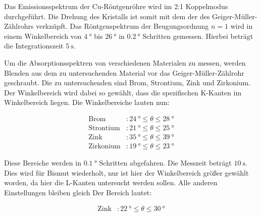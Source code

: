 Das Emissionsspektrum der Cu-Röntgenröhre wird im 2:1 Koppelmodus durchgeführt.
Die Drehung des Kristalls ist somit mit dem der des Geiger-Müller-Zählrohrs verknüpft.
Das Röntgenspektrum der Beugungsordnung $n=1$ wird in einem Winkelbereich von $\SI{4}{\degree}$ bis $\SI{26}{\degree}$ in $\SI{0.2}{\degree}$ Schritten gemessen.
Hierbei beträgt die Integrationszeit $\SI{5}{\second}$.

Um die Absorptionsspektren von verschiedenen Materialen zu messen, werden Blenden aus dem zu untersuchenden Material vor das Geiger-Müller-Zählrohr geschraubt.
Die zu untersuchenden sind Brom, Strontium, Zink und Zirkonium.
Der Winkelbereich wird dabei so gewählt, dass die spezifischen K-Kanten im Winkelbereich liegen.
Die Winkelbereiche lauten nun:

\begin{align*}
  \text{Brom} &: \SI{24}{\degree} \leq \theta \leq \SI{28}{\degree} \\
  \text{Strontium} &: \SI{21}{\degree} \leq \theta \leq \SI{25}{\degree} \\
  \text{Zink} &: \SI{35}{\degree} \leq \theta \leq \SI{39}{\degree} \\
  \text{Zirkonium} &: \SI{19}{\degree} \leq \theta \leq \SI{23}{\degree}
\end{align*}

Diese Bereiche werden in $\SI{0.1}{\degree}$ Schritten abgefahren.
Die Messzeit beträgt $\SI{10}{\second}$.
Dies wird für Bismut wiederholt, nur ist hier der Winkelbereich größer gewählt worden, da hier die L-Kanten untersucht werden sollen.
Alle anderen Einstellungen bleiben gleich
Der Bereich lautet:

\begin{align*}
  \text{Zink} &: \SI{22}{\degree} \leq \theta \leq \SI{30}{\degree}
\end{align*}
\FloatBarrier
